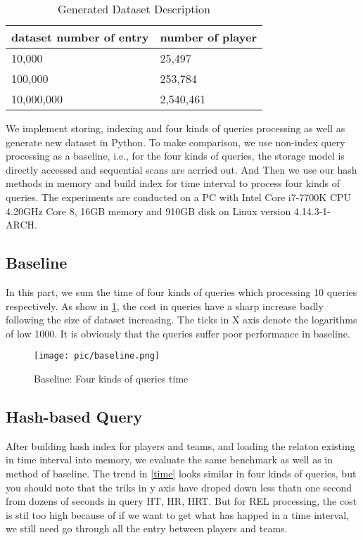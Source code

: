 \begin{table}
	\centering
	\caption{Generated Dataset Description}
	\label{gen_data}
	\begin{small}
		\begin{tabular}{p{4cm}|p{3cm}}
			\hline
			dataset number of entry  & number of player \\\hline
			10,000 & 25,497 \\\hline
			100,000 &  253,784 \\\hline
			10,000,000 & 2,540,461 \\\hline
		\end{tabular}
	\end{small}
\end{table}


We implement storing, indexing and four kinds of queries processing as well as generate new dataset in Python.
To make comparison, we use non-index query processing as a baseline, i.e., for the four kinds of queries, the 
storage model is directly accessed and sequential scans are acrried out. And Then we use our hash methods in 
memory and build index for time interval to process four kinds of queries. The experiments are conducted on a 
PC with Intel Core i7-7700K CPU 4.20GHz Core 8, 16GB memory and 910GB disk on Linux version 4.14.3-1-ARCH.

\subsection{Baseline}
In this part, we sum the time of four kinds of queries which processing 10 queries respectively. As show in 
\ref{baseline}, the cost in queries have a sharp increase badly following the size of dataset increasing. The 
ticks in X axis denote the logarithms of low 1000. It is obviously that the queries suffer poor performance in 
baseline.

\begin{figure}[H]
	\centering
	\texttt{[image: pic/baseline.png]}\\
	\caption{Baseline: Four kinds of queries time}
	\label{baseline}
\end{figure}

\subsection{Hash-based Query}
After building hash index for players and teams, and loading the relaton existing in time interval into memory, 
we evaluate the same benchmark as well as in method of baseline. The trend in \ref{time} looks similar in four 
kinds of queries, but you should note that the triks in y axis have droped down less thatn one second from dozens of 
seconds in query HT, HR, HRT. But for REL processing, the cost is stil too high because of if we want to get 
what has happed in a time interval, we still need go through all the entry between players and teams.

